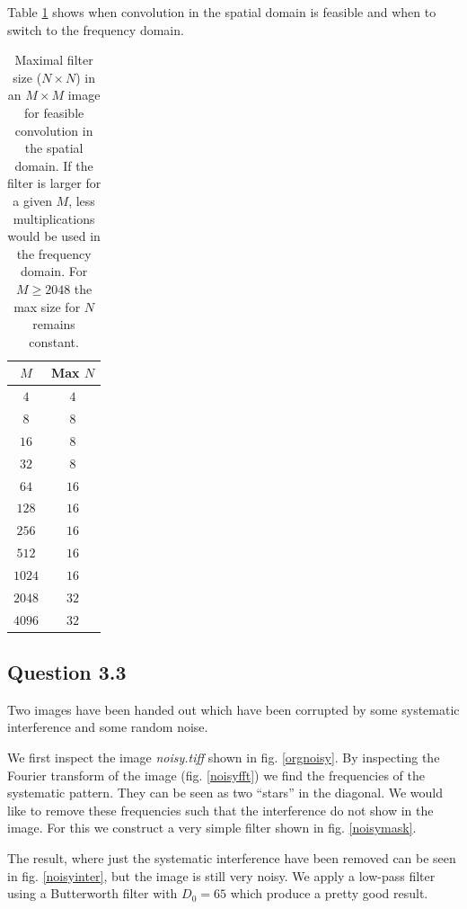 \documentclass[a4paper, 10pt, final]{article}
\begin{document}
Table \ref{table_sizes} shows when convolution in the spatial domain is
feasible and when to switch to the frequency domain.
\begin{table}[!h]
    \centering
    \begin{tabular}{|c|c|}
        \hline
        $M$ & Max $N$\\\hline
        $4$ & $4$ \\
        $8$ & $8$\\
        $16$ & $8$\\
        $32$ & $8$\\
        $64$ & $16$\\
        $128$ & $16$\\
        $256$ & $16$\\
        $512$ & $16$\\
        $1024$ & $16$\\
        $2048$ & $32$\\
        $4096$ & $32$\\
        \hline
    \end{tabular}
    \caption{Maximal filter size ($N \times N$) in
    an $M \times M$ image for feasible convolution in
    the spatial domain. If the filter is larger for a given $M$, less
    multiplications would be used in the frequency domain. For
    $M \geq 2048$ the max size for $N$ remains constant.}
    \label{table_sizes}
\end{table}

\subsection*{Question 3.3}
Two images have been handed out which have been corrupted by some
systematic interference and some random noise.

We first inspect the image \emph{noisy.tiff} shown in fig.
\ref{orgnoisy}. By inspecting the Fourier transform of the image (fig.
\ref{noisyfft}) we find the frequencies of the systematic pattern. They
can be seen as two ``stars'' in the diagonal. We would like to remove
these frequencies such that the interference do not show in the image.
For this we construct a very simple filter shown in fig.
\ref{noisymask}.

The result, where just the systematic interference have been removed can
be seen in fig. \ref{noisyinter}, but the image is still very noisy. We
apply a low-pass filter using a Butterworth filter with $D_0 = 65$ which
produce a pretty good result.
\end{document}
